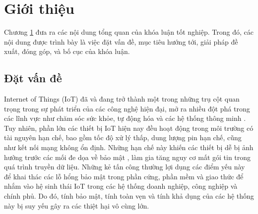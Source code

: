 \chapter{Giới thiệu}
\label{Chapter1}

Chương \ref{Chapter1}    đưa ra các nội dung tổng quan của khóa luận tốt nghiệp. Trong đó, các
nội dung được trình bày là việc đặt vấn đề, mục tiêu hướng tới, giải pháp đề xuất,
đóng góp, và bố cục của khóa luận.

\section{Đặt vấn đề}
Internet of Things (IoT) đã và đang trở thành một trong những trụ cột quan trọng trong sự phát triển của các công nghệ hiện đại, mở ra nhiều đột phá trong các lĩnh vực như chăm sóc sức khỏe, tự động hóa và các hệ thống thông minh \cite{iot1}. Tuy nhiên, phần lớn các thiết bị IoT hiện nay đều hoạt động trong môi trường có tài nguyên hạn chế, bao gồm tốc độ xử lý thấp, dung lượng pin hạn chế, cũng như kết nối mạng không ổn định. Những hạn chế này khiến các thiết bị dễ bị ảnh hưởng trước các mối đe dọa về bảo mật \cite{iot2}, làm gia tăng nguy cơ mất gói tin trong quá trình truyền dữ liệu. Những kẻ tấn công thường lợi dụng các điểm yếu này để khai thác các lỗ hổng bảo mật trong phần cứng, phần mềm và giao thức để nhắm vào hệ sinh thái IoT trong các hệ thống doanh nghiệp, công nghiệp và chính phủ. Do đó, tính bảo mật, tính toàn vẹn và tính khả dụng của các hệ thống này bị suy yếu gây ra các thiệt hại vô cùng lớn.

